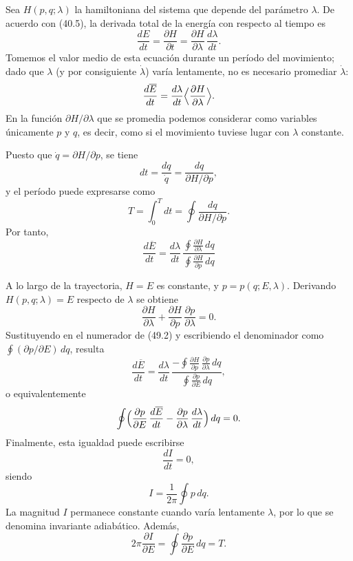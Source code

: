 \documentclass[12pt]{article}
\begin{document}
\noindent Sea \(H(p,q;\lambda)\) la hamiltoniana del sistema que depende del parámetro \(\lambda\). De acuerdo con (40.5), la derivada total de la energía con respecto al tiempo es
\[
\frac{dE}{dt}
=
\frac{\partial H}{\partial t}
=
\frac{\partial H}{\partial \lambda}\,\frac{d\lambda}{dt}.
\]
Tomemos el valor medio de esta ecuación durante un período del movimiento; dado que \(\lambda\) (y por consiguiente \(\dot\lambda\)) varía lentamente, no es necesario promediar \(\dot\lambda\):
\[
\frac{d\overline E}{dt}
=
\frac{d\lambda}{dt}\Bigl\langle\frac{\partial H}{\partial \lambda}\Bigr\rangle.
\]
En la función \(\partial H/\partial\lambda\) que se promedia podemos considerar como variables únicamente \(p\) y \(q\), es decir, como si el movimiento tuviese lugar con \(\lambda\) constante.

Puesto que \(\dot q=\partial H/\partial p\), se tiene
\[
dt=\frac{dq}{\dot q}
=\frac{dq}{\partial H/\partial p},
\]
y el período puede expresarse como
\[
T=\int_{0}^{T}dt
=\oint\frac{dq}{\partial H/\partial p}.
\]
Por tanto,
\begin{equation}
\frac{d\overline E}{dt}
=
\frac{d\lambda}{dt}\,
\frac{\displaystyle\oint\frac{\partial H}{\partial\lambda}\,dq}
     {\displaystyle\oint\frac{\partial H}{\partial p}\,dq}
\tag{49.2}
\end{equation}

\noindent A lo largo de la trayectoria, \(H=E\) es constante, y \(p=p(q;E,\lambda)\). Derivando \(H(p,q;\lambda)=E\) respecto de \(\lambda\) se obtiene
\[
\frac{\partial H}{\partial \lambda}
+
\frac{\partial H}{\partial p}\,\frac{\partial p}{\partial \lambda}
=0.
\]
Sustituyendo en el numerador de (49.2) y escribiendo el denominador como \(\oint(\partial p/\partial E)\,dq\), resulta
\[
\frac{d\overline E}{dt}
=
\frac{d\lambda}{dt}\,
\frac{-\displaystyle\oint\frac{\partial H}{\partial p}\,
                  \frac{\partial p}{\partial \lambda}\,dq}
     {\displaystyle\oint\frac{\partial p}{\partial E}\,dq},
\]
o equivalentemente
\[
\oint\Bigl(\frac{\partial p}{\partial E}\,\frac{d\overline E}{dt}
          -\frac{\partial p}{\partial \lambda}\,\frac{d\lambda}{dt}\Bigr)\,dq
=0.
\]
Finalmente, esta igualdad puede escribirse
\begin{equation}
\frac{dI}{dt}=0,
\tag{49.4}
\end{equation}
siendo
\begin{equation}
I=\frac{1}{2\pi}\oint p\,dq.
\tag{49.5}
\end{equation}
La magnitud \(I\) permanece constante cuando varía lentamente \(\lambda\), por lo que se denomina invariante adiabático. Además,
\begin{equation}
2\pi\frac{\partial I}{\partial E}
=\oint\frac{\partial p}{\partial E}\,dq
=T.
\tag{49.6}
\end{equation}
\end{document}

